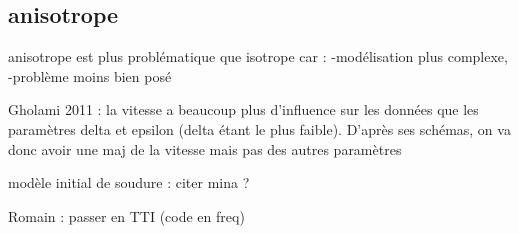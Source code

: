\subsection{anisotrope}

anisotrope est plus problématique que isotrope car : 
-modélisation plus complexe,
-problème moins bien posé

Gholami 2011 : la vitesse a beaucoup plus d'influence sur les données que les paramètres delta et epsilon (delta étant le plus faible). D'après ses schémas, on va donc avoir une maj de la vitesse mais pas des autres paramètres

modèle initial de soudure : citer mina ?



Romain : passer en TTI (code en freq)

